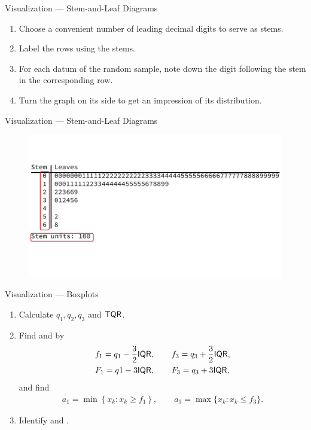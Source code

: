 \begin{frame}{Visualization --- Stem-and-Leaf Diagrams}

\begin{enumerate}
	\justifying
	\item Choose a convenient number of leading decimal digits to serve as stems.
	\item Label the rows using the stems.
	\item For each datum of the random sample, note down the digit following the stem in the corresponding row.
	\item Turn the graph on its side to get an impression of its distribution.
\end{enumerate}

\end{frame}

\begin{frame}{Visualization --- Stem-and-Leaf Diagrams}

\begin{figure}[htbp]
	\centering
	\includegraphics[width=\linewidth]{./images/rc4fig1.pdf}
\end{figure}

\end{frame}


\begin{frame}{Visualization --- Boxplots}

\begin{enumerate}
	\justifying
	\item Calculate $q_1, q_2, q_3$ and $\mathsf{TQR}$.
	\item Find  and  by
	\begin{align*}
	& f_1 = q_1 - \frac{3}{2}\mathsf{IQR}, \qquad f_3 = q_3 + \frac{3}{2}\mathsf{IQR}, \\
	& F_1 = q1 - 3\mathsf{IQR}, \qquad F_3 = q_3 + 3\mathsf{IQR},
	\end{align*}
	and find 
	\begin{align*}
	a_1 = \min\left\{x_k: x_k\geq f_1 \right\}, \qquad a_3 = \max\{x_k: x_k\leq f_3 \}.
	\end{align*}
	\item Identify  and .
\end{enumerate}

\end{frame}


